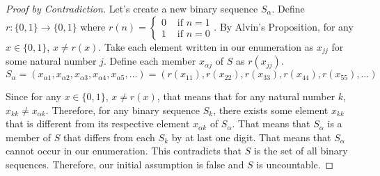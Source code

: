 \documentclass[11pt]{article}
\begin{document}
\begin{proof}[Proof by Contradiction]
        Let's create a new binary sequence $S_\alpha$.
        Define $r: \{0, 1\} \to \{0, 1\}$ where $r(n) = \begin{cases} 0 &\text{ if } n = 1\\1 &\text{ if } n = 0 \end{cases}$.
        By Alvin's Proposition, for any $x \in \{0, 1\}$, $x \neq r(x)$.
        Take each element written in our enumeration as $x_{jj}$ for some natural number $j$. 
        Define each member $x_{\alpha j}$ of $S$ as $r(x_{jj})$.
        \begin{equation}
            S_\alpha    =   (x_{\alpha 1}, x_{\alpha 2}, x_{\alpha 3}, x_{\alpha 4}, x_{\alpha 5}, \dots)
                        =   (r(x_{11}), r(x_{22}), r(x_{33}), r(x_{44}), r(x_{55}), \dots)
        \end{equation}

        Since for any $x \in \{0, 1\}$, $x \neq r(x)$, that means that for any natural number $k$, $x_{kk} \neq x_{\alpha k}$.
        Therefore, for any binary sequence $S_k$, there exists some element $x_{kk}$ that is different from its respective element $x_{\alpha k}$ of $S_\alpha$.
        That means that $S_\alpha$ is a member of $S$ that differs from each $S_k$ by at last one digit.
        That means that $S_{\alpha}$ cannot occur in our enumeration.
        This contradicts that $S$ is the set of all binary sequences.
        Therefore, our initial assumption is false and $S$ is uncountable. 
    \end{proof}
\end{document}
